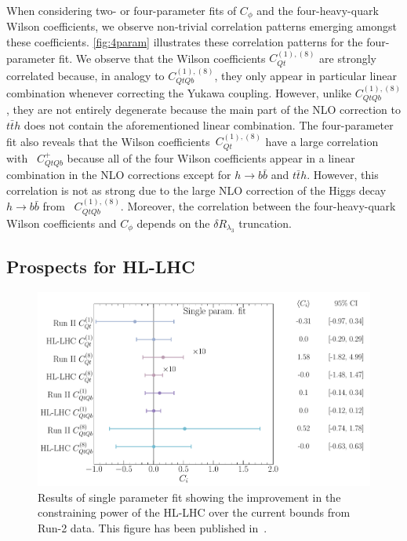 	When considering two- or four-parameter fits of $C_\phi$ and the four-heavy-quark Wilson coefficients, we observe non-trivial correlation patterns emerging amongst these coefficients.  \autoref{fig:4param} illustrates these correlation patterns for the four-parameter fit. 
	We observe that the Wilson coefficients $C_{Qt}^{(1),(8) }$ are strongly correlated because, in analogy to $C_{QtQb}^{(1),(8) }$, they only appear in particular linear combination whenever correcting the Yukawa coupling. However,  unlike $C_{QtQb}^{(1),(8) }$, they are not entirely degenerate because the main part of the NLO correction to $t\bar t h$ does not contain the aforementioned linear combination.  The four-parameter fit also reveals that the Wilson coefficients~$C_{Qt}^{(1),(8) }$ have a large correlation with ~$C_{QtQb}^{+}$ because all of the four Wilson coefficients appear in a linear combination in the NLO corrections except for $ h\to b\bar b$ and $ t\bar{t} h$. However, this correlation is not as strong due to the large NLO correction of the Higgs decay $h \to b \bar b$ from ~$C_{QtQb}^{(1),(8) }$. Moreover, the correlation between the four-heavy-quark Wilson coefficients and $C_{\phi}$ depends on the $\delta R_{\lambda_3}$ truncation. 
	
	\subsection{Prospects for HL-LHC}
	\begin{figure}[t!]
		\begin{center}
			\includegraphics[width=0.75\linewidth]{fig/uebeblick_forest_ci}
		\end{center}
		\caption{ Results of single parameter fit showing the improvement in the constraining power of the HL-LHC over the current bounds from Run-2 data.  This figure has been published in~\cite{Alasfar:2022zyr}. \label{fig:HLLHC} }
	\end{figure}
	
